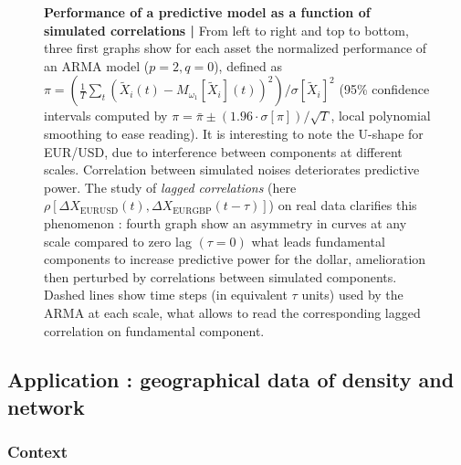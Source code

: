 \begin{figure}[h!]
\caption{\small \textbf{Performance of a predictive model as a function of simulated correlations | } From left to right and top to bottom, three first graphs show for each asset the normalized performance of an ARMA model ($p=2,q=0$), defined as $\pi = \left(\frac{1}{T}\sum_t\left(\tilde{X}_i(t) - M_{\omega_1}\left[\tilde{X}_i\right](t)\right)^2 \right) / \sigma \left[ \tilde{X}_i \right]^2$ (95\% confidence intervals computed by $\pi = \bar{\pi} \pm (1.96\cdot \sigma [\pi])/\sqrt{T}$, local polynomial smoothing to ease reading). It is interesting to note the U-shape for EUR/USD, due to interference between components at different scales. Correlation between simulated noises deteriorates predictive power. The study of \emph{lagged correlations} (here $\rho [\Delta X_{\textrm{EURUSD}}(t),\Delta X_{\textrm{EURGBP}}(t-\tau)]$) on real data clarifies this phenomenon : fourth graph show an asymmetry in curves at any scale compared to zero lag $(\tau = 0)$ what leads fundamental components to increase predictive power for the dollar, amelioration then perturbed by correlations between simulated components. Dashed lines show time steps (in equivalent $\tau$ units) used by the ARMA at each scale, what allows to read the corresponding lagged correlation on fundamental component.}
\label{fig:model_perf}
\end{figure}




\newpage




\subsection{Application : geographical data of density and network}


\subsubsection{Context}


